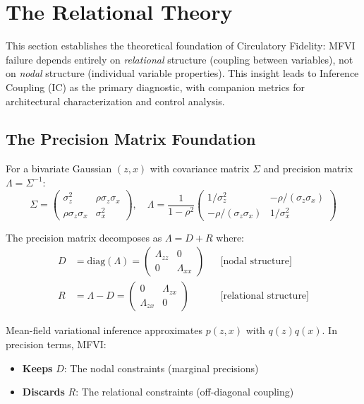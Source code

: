 \documentclass[10pt]{article} %
\theoremstyle{plain}
\theoremstyle{definition}
\begin{document}
\section{The Relational Theory}
\label{sec:definition}

This section establishes the theoretical foundation of Circulatory Fidelity: MFVI failure depends entirely on \emph{relational} structure (coupling between variables), not on \emph{nodal} structure (individual variable properties). This insight leads to Inference Coupling (IC) as the primary diagnostic, with companion metrics for architectural characterization and control analysis.

\subsection{The Precision Matrix Foundation}
\label{sec:precision}

For a bivariate Gaussian $(z, x)$ with covariance matrix $\Sigma$ and precision matrix $\Lambda = \Sigma^{-1}$:
\begin{equation}
\Sigma = \begin{pmatrix} \sigma_z^2 & \rho\sigma_z\sigma_x \\ \rho\sigma_z\sigma_x & \sigma_x^2 \end{pmatrix}, \quad
\Lambda = \frac{1}{1-\rho^2}\begin{pmatrix} 1/\sigma_z^2 & -\rho/(\sigma_z\sigma_x) \\ -\rho/(\sigma_z\sigma_x) & 1/\sigma_x^2 \end{pmatrix}
\end{equation}

The precision matrix decomposes as $\Lambda = D + R$ where:
\begin{align}
D &= \text{diag}(\Lambda) = \begin{pmatrix} \Lambda_{zz} & 0 \\ 0 & \Lambda_{xx} \end{pmatrix} && \text{[nodal structure]} \\
R &= \Lambda - D = \begin{pmatrix} 0 & \Lambda_{zx} \\ \Lambda_{zx} & 0 \end{pmatrix} && \text{[relational structure]}
\end{align}

Mean-field variational inference approximates $p(z,x)$ with $q(z)q(x)$. In precision terms, MFVI:
\begin{itemize}
    \item \textbf{Keeps} $D$: The nodal constraints (marginal precisions)
    \item \textbf{Discards} $R$: The relational constraints (off-diagonal coupling)
\end{itemize}
\end{document}
